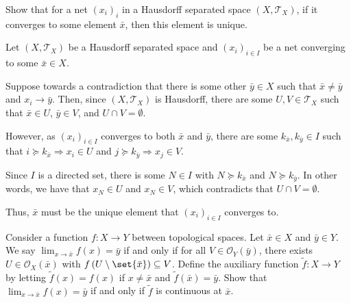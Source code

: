 \documentclass[10pt]{mypackage}
\begin{document}
\begin{problem}[Problem I.3]
  Show that for a net $\left( x_i \right)_i$ in a Hausdorff separated space $\left( X, \mathcal{T}_X \right)$, if it converges to some element $ \bar{x} $, then this element is unique.
\end{problem}
\begin{solution}
  Let $\left(X, \mathcal{T}_X\right)$ be a Hausdorff separated space and $\left(x_i\right)_{i\in I}$ be a net converging to some $\bar x\in X$.

  Suppose towards a contradiction that there is some other $\bar y \in X$ such that $\bar x\neq \bar y$ and $x_i\to \bar y$. Then, since $\left(X,\mathcal{T}_X\right)$ is Hausdorff, there are some $U, V \in \mathcal{T}_X$ such that $\bar x\in U$, $\bar y\in V$, and $U\cap V = \emptyset$.

However, as $\left(x_i\right)_{i\in I}$ converges to both $\bar x$ and $\bar y$, there are some $k_{\bar x},k_{\bar y}\in I$ such that $i\succeq k_{\bar x} \Rightarrow x_i\in U$ and $j\succeq k_{\bar y} \Rightarrow x_j\in V$.

Since $I$ is a directed set, there is some $N \in I$ with $N \succeq k_{\bar x}$ and $N \succeq k_{\bar y}$. In other words, we have that $x_N \in U$ and $x_N \in V$, which contradicts that $U\cap V = \emptyset$.

Thus, $\bar x$ must be the unique element that $\left(x_i\right)_{i\in I}$ converges to.
\end{solution}
\begin{problem}[Problem I.4]
  Consider a function $f\colon X\to Y$ between topological spaces. Let $ \bar{x}\in X $ and $\bar{y}\in Y$. We say $\lim_{x\to\bar{x}}f(x) = \bar{y}$ if and only if for all $V\in \mathcal{O}_Y\left(\bar{y}\right)$, there exists $U\in \mathcal{O}_X\left( \bar{x} \right)$ with $f\left( U\setminus \set{\bar{x}} \right)\subseteq V$. Define the auxiliary function $ \tilde{f}\colon X\to Y $ by letting $ \tilde{f}(x) = f(x) $ if $x\neq \bar{x}$ and $ \tilde{f}\left( \bar{x} \right) = \bar{y} $. Show that $\lim_{x\to \bar{x}}f(x) = \bar{y}$ if and only if $ \tilde{f} $ is continuous at $\bar{x}$.
\end{problem}
\end{document}
